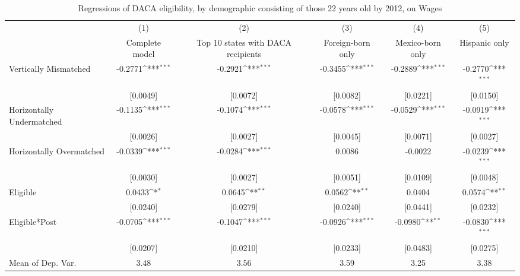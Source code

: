 \begin{table}[htbp]\centering
\def\sym#1{\ifmmode^{#1}\else\(^{#1}\)\fi}
\caption{Regressions of DACA eligibility, by demographic consisting of those 22 years old by 2012, on Wages}
\begin{tabular}{l*{5}{c}}
\toprule
                    &\multicolumn{1}{c}{(1)}         &\multicolumn{1}{c}{(2)}         &\multicolumn{1}{c}{(3)}         &\multicolumn{1}{c}{(4)}         &\multicolumn{1}{c}{(5)}         \\
                    &Complete model         &Top 10 states with DACA recipients         &Foreign-born only         &Mexico-born only         &Hispanic only         \\
\midrule
Vertically Mismatched&     -0.2771\sym{***}&     -0.2921\sym{***}&     -0.3455\sym{***}&     -0.2889\sym{***}&     -0.2770\sym{***}\\
                    &    [0.0049]         &    [0.0072]         &    [0.0082]         &    [0.0221]         &    [0.0150]         \\
\addlinespace
Horizontally Undermatched&     -0.1135\sym{***}&     -0.1074\sym{***}&     -0.0578\sym{***}&     -0.0529\sym{***}&     -0.0919\sym{***}\\
                    &    [0.0026]         &    [0.0027]         &    [0.0045]         &    [0.0071]         &    [0.0027]         \\
\addlinespace
Horizontally Overmatched&     -0.0339\sym{***}&     -0.0284\sym{***}&      0.0086         &     -0.0022         &     -0.0239\sym{***}\\
                    &    [0.0030]         &    [0.0027]         &    [0.0051]         &    [0.0109]         &    [0.0048]         \\
\addlinespace
Eligible            &      0.0433\sym{*}  &      0.0645\sym{**} &      0.0562\sym{**} &      0.0404         &      0.0574\sym{**} \\
                    &    [0.0240]         &    [0.0279]         &    [0.0240]         &    [0.0441]         &    [0.0232]         \\
\addlinespace
Eligible*Post       &     -0.0705\sym{***}&     -0.1047\sym{***}&     -0.0926\sym{***}&     -0.0980\sym{**} &     -0.0830\sym{***}\\
                    &    [0.0207]         &    [0.0210]         &    [0.0233]         &    [0.0483]         &    [0.0275]         \\
\midrule
Mean of Dep. Var.   &        3.48         &        3.56         &        3.59         &        3.25         &        3.38         \\

\end{tabular}
\end{table}

